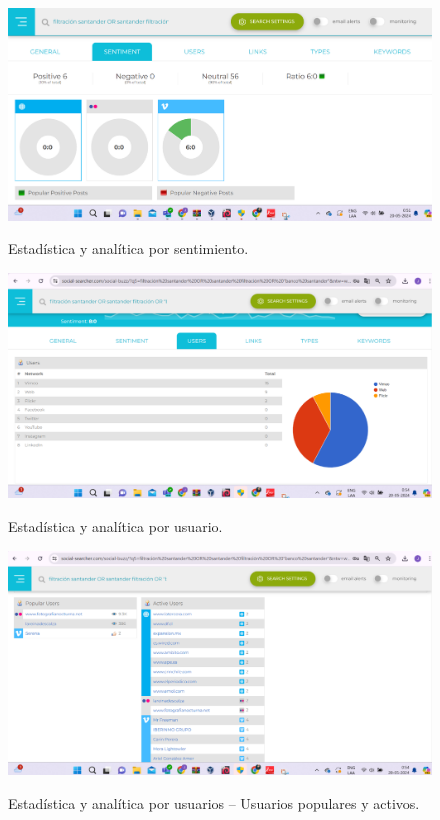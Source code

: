 \documentclass[stu, 11pt, letterpaper, donotrepeattitle, floatsintext, natbib]{apa7}
\begin{document}
\begin{figure}[H]
\centering
\caption{Estadística y analítica por sentimiento.}
\includegraphics[width=0.75\linewidth]{osi21.png} %
\label{fig:OverallEffect}
\end{figure}

\begin{figure}[H]
\centering
\caption{Estadística y analítica por usuario.}
\includegraphics[width=0.75\linewidth]{osi22.png} %
\label{fig:OverallEffect}
\end{figure}

\begin{figure}[H]
\centering
\caption{Estadística y analítica por usuarios – Usuarios populares y activos.}
\includegraphics[width=0.75\linewidth]{osi23.png} %
\label{fig:OverallEffect}
\end{figure}
\end{document}
